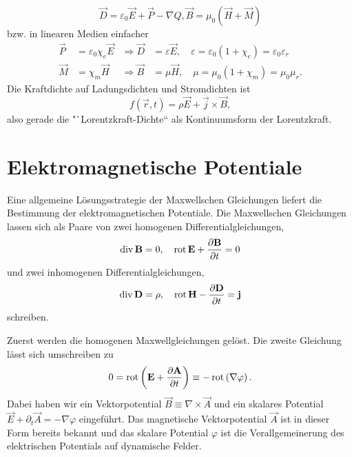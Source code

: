 \begin{equation*}
	\vec {D}=\varepsilon _{0}\vec {E}+\vec {P}-\nabla Q, \vec {B}=\mu _{0}\left(\vec {H}+\vec {M}\right)
\end{equation*}
bzw. in linearen Medien einfacher
\begin{align*}
	\vec {P}&=\varepsilon _{0}\chi _{e}\vec {E}&\Rightarrow \vec {D}&=\varepsilon \vec {E},\quad \varepsilon =\varepsilon _{0}\left(1+\chi _{e}\right)=\varepsilon _{0}\varepsilon _{r} \\
	\vec {M}&=\chi _{m}\vec {H}&\Rightarrow \vec {B}&=\mu \vec {H},\quad \mu =\mu _{0}\left(1+\chi _{m}\right)=\mu _{0}\mu _{r}.
\end{align*}
Die Kraftdichte auf Ladungsdichten und Stromdichten ist
\begin{equation*}
	f\left(\vec {r},t\right)=\rho \vec {E}+\vec {j}\times \vec {B},
\end{equation*}
also gerade die "`Lorentzkraft-Dichte`` als Kontinuumsform der Lorentzkraft.

\section{Elektromagnetische Potentiale}

Eine allgemeine Lösungsstrategie der Maxwellschen Gleichungen liefert die Bestimmung der elektromagnetischen Potentiale. Die Maxwellschen Gleichungen lassen sich als Paare von zwei homogenen Differentialgleichungen,
\begin{equation*}
	\operatorname{div} \mathbf{B}=0, \quad\operatorname{rot} \mathbf{E}+\frac{\partial \mathbf{B}}{\partial t}=0
\end{equation*}
und zwei inhomogenen Differentialgleichungen,
\begin{equation*}
	\operatorname{div} \mathbf{D}=\rho ,\quad \operatorname{rot} \mathbf{H}-\frac{\partial \mathbf{D}}{\partial t}=\mathbf{j}
\end{equation*}
schreiben.

Zuerst werden die homogenen Maxwellgleichungen gelöst. Die zweite Gleichung lässt sich umschreiben zu
\begin{equation*}
	0=\operatorname{rot} \left(\mathbf{E}+\frac{\partial \mathbf{A}}{\partial t}\right)\equiv -\operatorname{rot} \left(\nabla \varphi \right).
\end{equation*}
Dabei haben wir ein Vektorpotential $\vec {B}\equiv \nabla \times \vec {A}$ und ein skalares Potential $\vec {E}+\partial _{t}\vec {A}=-\nabla \varphi $ eingeführt. Das magnetische Vektorpotential $\vec {A}$ ist in dieser Form bereits bekannt und das skalare Potential $\varphi $ ist die Verallgemeinerung des elektrischen Potentials auf dynamische Felder.

